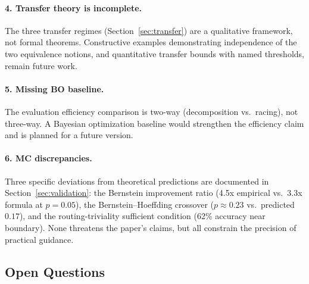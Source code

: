 \documentclass[twoside,11pt]{article}
\begin{document}
\paragraph{4. Transfer theory is incomplete.}
The three transfer regimes (Section~\ref{sec:transfer}) are a qualitative framework, not formal theorems.
Constructive examples demonstrating independence of the two equivalence notions, and quantitative transfer bounds with named thresholds, remain future work.

\paragraph{5. Missing BO baseline.}
The evaluation efficiency comparison is two-way (decomposition vs.\ racing), not three-way.
A Bayesian optimization baseline would strengthen the efficiency claim and is planned for a future version.

\paragraph{6. MC discrepancies.}
Three specific deviations from theoretical predictions are documented in Section~\ref{sec:validation}: the Bernstein improvement ratio (4.5x empirical vs.\ 3.3x formula at $p = 0.05$), the Bernstein--Hoeffding crossover ($p \approx 0.23$ vs.\ predicted $0.17$), and the routing-triviality sufficient condition (62\% accuracy near boundary).
None threatens the paper's claims, but all constrain the precision of practical guidance.

\subsection{Open Questions}
\end{document}
